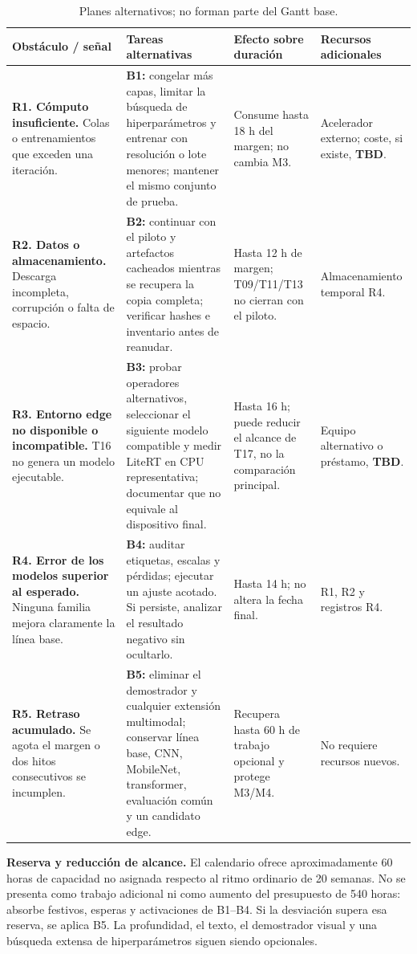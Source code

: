 \documentclass[10pt,a4paper]{article}
\newcommand{\task}[1]{\textbf{#1}}
\newcommand{\tbd}{\textbf{TBD}}
\begin{document}
\begin{table}[h]
\centering
\caption{Planes alternativos; no forman parte del Gantt base.}
\scriptsize
\begin{tabularx}{\textwidth}{L{2.25cm}Y L{3.0cm} L{2.35cm}}
\toprule
\textbf{Obstáculo / señal} & \textbf{Tareas alternativas} & \textbf{Efecto sobre duración} & \textbf{Recursos adicionales} \\
\midrule
\task{R1. Cómputo insuficiente.} Colas o entrenamientos que exceden una iteración. & \task{B1:} congelar más capas, limitar la búsqueda de hiperparámetros y entrenar con resolución o lote menores; mantener el mismo conjunto de prueba. & Consume hasta 18 h del margen; no cambia M3. & Acelerador externo; coste, si existe, \tbd. \\
\task{R2. Datos o almacenamiento.} Descarga incompleta, corrupción o falta de espacio. & \task{B2:} continuar con el piloto y artefactos cacheados mientras se recupera la copia completa; verificar hashes e inventario antes de reanudar. & Hasta 12 h de margen; T09/T11/T13 no cierran con el piloto. & Almacenamiento temporal R4. \\
\task{R3. Entorno edge no disponible o incompatible.} T16 no genera un modelo ejecutable. & \task{B3:} probar operadores alternativos, seleccionar el siguiente modelo compatible y medir LiteRT en CPU representativa; documentar que no equivale al dispositivo final. & Hasta 16 h; puede reducir el alcance de T17, no la comparación principal. & Equipo alternativo o préstamo, \tbd. \\
\task{R4. Error de los modelos superior al esperado.} Ninguna familia mejora claramente la línea base. & \task{B4:} auditar etiquetas, escalas y pérdidas; ejecutar un ajuste acotado. Si persiste, analizar el resultado negativo sin ocultarlo. & Hasta 14 h; no altera la fecha final. & R1, R2 y registros R4. \\
\task{R5. Retraso acumulado.} Se agota el margen o dos hitos consecutivos se incumplen. & \task{B5:} eliminar el demostrador y cualquier extensión multimodal; conservar línea base, CNN, MobileNet, transformer, evaluación común y un candidato edge. & Recupera hasta 60 h de trabajo opcional y protege M3/M4. & No requiere recursos nuevos. \\
\bottomrule
\end{tabularx}
\end{table}

\textbf{Reserva y reducción de alcance.} El calendario ofrece aproximadamente 60 horas de capacidad no asignada respecto al ritmo ordinario de 20 semanas. No se presenta como trabajo adicional ni como aumento del presupuesto de 540 horas: absorbe festivos, esperas y activaciones de B1--B4. Si la desviación supera esa reserva, se aplica B5. La profundidad, el texto, el demostrador visual y una búsqueda extensa de hiperparámetros siguen siendo opcionales.
\end{document}
